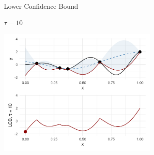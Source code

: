\documentclass[11pt,compress,t,notes=noshow, xcolor=table]{beamer}
\begin{document}
\begin{vbframe}{Lower Confidence Bound}
\framebreak

$\tau = 10$

\begin{center}
  \includegraphics[width = 0.6\textwidth]{figure_man/bayesian_loop_lcb_2.png}
\end{center}

\end{vbframe}

\endlecture
\end{document}
